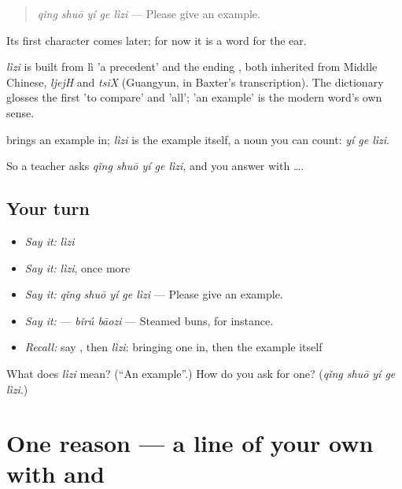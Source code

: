 \begin{quote}
\emph{qǐng shuō yí ge lìzi} — Please give an example.
\end{quote}

Its first character comes later; for now it is a word for the ear.

\begin{cousinweb}
\emph{lìzi} is built from lì 'a precedent' and the ending , both inherited from Middle Chinese, \emph{ljejH} and \emph{tsiX} (Guangyun, in Baxter's transcription). The dictionary glosses the first 'to compare' and 'all'; 'an example' is the modern word's own sense.
\end{cousinweb}

\begin{grammarlens}[title={What you've built}]
 brings an example in; \emph{lìzi} is the example itself, a noun you can count: \emph{yí ge lìzi}.

So a teacher asks \emph{qǐng shuō yí ge lìzi}, and you answer with  ….
\end{grammarlens}

\subsection*{Your turn}
\begin{itemize}
\raggedright
  \item \emph{Say it:} \emph{lìzi}
  \item \emph{Say it:} \emph{lìzi}, once more
  \item \emph{Say it:} \emph{qǐng shuō yí ge lìzi} — Please give an example.
  \item \emph{Say it:}  — \emph{bǐrú bāozi} — Steamed buns, for instance.
  \item \emph{Recall:} say , then \emph{lìzi}: bringing one in, then the example itself
\end{itemize}

\begin{tcolorbox}[breakable,colback=teal!4,colframe=teal!35!black,title={Before you move on}]
What does \emph{lìzi} mean? (\textquotedblleft{}An example\textquotedblright{}.) How do you ask for one? (\emph{qǐng shuō yí ge lìzi}.)
\end{tcolorbox}
\section[(one reason)]{One reason — a line of your own with  and }


